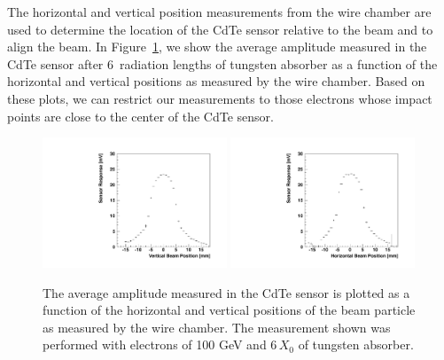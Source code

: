 The horizontal and vertical position measurements from the wire chamber are used to determine the location
of the CdTe sensor relative to the beam and to align the beam. In 
Figure~\ref{fig:BeamSensorPosition}, we show the average amplitude measured in the
CdTe sensor after $6$~radiation lengths of tungsten absorber
as a function of the horizontal and vertical positions as measured by the wire chamber. Based
on these plots, we can restrict our measurements to those electrons whose impact points are close
to the center of the CdTe sensor.

\begin{figure}[htbp] 
\centering
\includegraphics[width=0.49\textwidth]{figures/CdTeProfile_X.pdf} 
\includegraphics[width=0.49\textwidth]{figures/CdTeProfile_Y.pdf} 
\caption{The average amplitude measured in the CdTe sensor is plotted as a function of 
the horizontal and vertical positions of the beam particle as measured by the wire chamber. The measurement shown was performed with electrons of 100 GeV and $6\, X_0$ of tungsten absorber.} 
\label{fig:BeamSensorPosition} 
\end{figure} 


